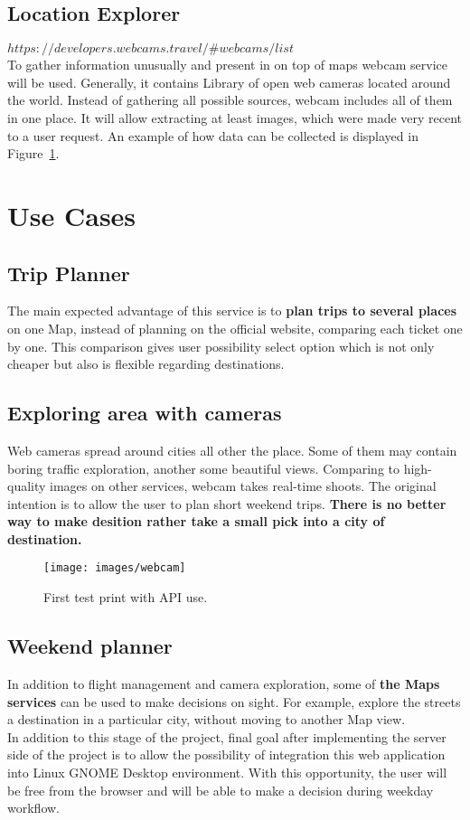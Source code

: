 \documentclass[12pt]{article}
\numberwithin{equation}{section} %
\numberwithin{figure}{section} %
\numberwithin{table}{section} %
\begin{document}
	\subsection{Location Explorer}
		$ https://developers.webcams.travel/\#webcams/list $ \\
		
		To gather information unusually and present in on top of maps webcam service will be used. Generally, it contains Library of open web cameras located around the world. Instead of gathering all possible sources, webcam includes all of them in one place. It will allow extracting at least images, which were made very recent to a user request. An example of how data can be collected is displayed in Figure~\ref{fig:webcam}.
\section{Use Cases}
	\subsection{Trip Planner}
	The main expected advantage of this service is to \textbf{plan trips to several places} on one Map, instead of planning on the official website, comparing each ticket one by one. This comparison gives user possibility select option which is not only cheaper but also is flexible regarding destinations.
	
	\subsection{Exploring area with cameras}
	Web cameras spread around cities all other the place. Some of them may contain boring traffic exploration, another some beautiful views. Comparing to high-quality images on other services, webcam takes real-time shoots. The original intention is to allow the user to plan short weekend trips. \textbf{There is no better way to make desition rather take a small pick into a city of destination.}
	\begin{figure}[H]
		\centering        
		\texttt{[image: images/webcam]}
		\caption{First test print with API use.}
		\label{fig:webcam}
	\end{figure}
	\subsection{Weekend planner}
	In addition to flight management and camera exploration, some of \textbf{the Maps services} can be used to make decisions on sight. For example, explore the streets a destination in a particular city, without moving to another Map view. \\
	In addition to this stage of the project, final goal after implementing the server side of the project is to allow the possibility of integration this web application into Linux GNOME Desktop environment. With this opportunity, the user will be free from the browser and will be able to make a decision during weekday workflow.
	
\end{document}
